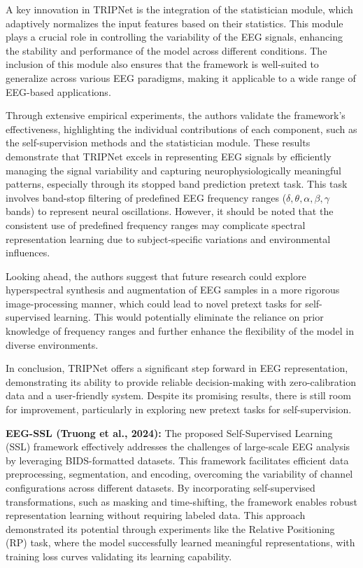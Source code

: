 A key innovation in TRIPNet is the integration of the statistician module, which adaptively normalizes the input features based on their statistics. This module plays a crucial role in controlling the variability of the EEG signals, enhancing the stability and performance of the model across different conditions. The inclusion of this module also ensures that the framework is well-suited to generalize across various EEG paradigms, making it applicable to a wide range of EEG-based applications.

Through extensive empirical experiments, the authors validate the framework's effectiveness, highlighting the individual contributions of each component, such as the self-supervision methods and the statistician module. These results demonstrate that TRIPNet excels in representing EEG signals by efficiently managing the signal variability and capturing neurophysiologically meaningful patterns, especially through its stopped band prediction pretext task. This task involves band-stop filtering of predefined EEG frequency ranges ($\delta, \theta, \alpha, \beta, \gamma$ bands) to represent neural oscillations. However, it should be noted that the consistent use of predefined frequency ranges may complicate spectral representation learning due to subject-specific variations and environmental influences.

Looking ahead, the authors suggest that future research could explore hyperspectral synthesis and augmentation of EEG samples in a more rigorous image-processing manner, which could lead to novel pretext tasks for self-supervised learning. This would potentially eliminate the reliance on prior knowledge of frequency ranges and further enhance the flexibility of the model in diverse environments.

In conclusion, TRIPNet offers a significant step forward in EEG representation, demonstrating its ability to provide reliable decision-making with zero-calibration data and a user-friendly system. Despite its promising results, there is still room for improvement, particularly in exploring new pretext tasks for self-supervision.

\vspace{0.5em}
\newpage
\textbf{EEG-SSL (Truong et al., 2024):}
The proposed Self-Supervised Learning (SSL) framework effectively addresses the challenges of large-scale EEG analysis by leveraging BIDS-formatted datasets. This framework facilitates efficient data preprocessing, segmentation, and encoding, overcoming the variability of channel configurations across different datasets. By incorporating self-supervised transformations, such as masking and time-shifting, the framework enables robust representation learning without requiring labeled data. This approach demonstrated its potential through experiments like the Relative Positioning (RP) task, where the model successfully learned meaningful representations, with training loss curves validating its learning capability.

